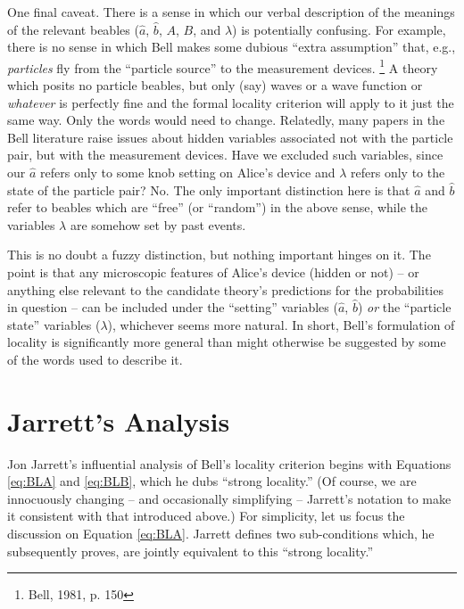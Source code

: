 \documentclass[12pt]{article}
\begin{document}
One final caveat.  There is a sense in which our
verbal description of the meanings of the relevant beables ($\hat{a}$,
$\hat{b}$, $A$, $B$, and $\lambda$) is potentially confusing.  For
example, there is no sense in which Bell makes some dubious ``extra
assumption'' that, e.g., \emph{particles} fly from the ``particle
source'' to the measurement devices.   
\footnote{Bell, 1981, p. 150}
A theory which posits no
particle beables, but only (say) waves or a wave function or \emph{whatever}
is perfectly fine and the formal locality criterion
will apply to it just the same way.  Only the words would need to
change.  Relatedly, many papers in the Bell literature raise issues
about hidden variables associated not with the particle pair, but with
the measurement devices.  Have we excluded such variables, since our
$\hat{a}$ refers only to some knob setting on Alice's device and
$\lambda$ refers only to the state of the particle pair?  No.  The
only important distinction here is that $\hat{a}$ and $\hat{b}$ refer 
to beables which are ``free'' (or ``random'') in the above sense,
while the variables $\lambda$ are somehow set by past events.

This is no doubt a fuzzy distinction, but nothing important hinges on
it.  The point is that any
microscopic features of Alice's device (hidden or not)  -- or anything
else relevant to the candidate theory's predictions for the probabilities in
question -- can be included under the ``setting'' variables ($\hat{a}$,
$\hat{b}$) \emph{or} the ``particle state'' variables ($\lambda$),
whichever seems more natural.  In short, Bell's formulation of
locality is significantly more general than might otherwise be
suggested by some of the words used to describe it.





\section{Jarrett's Analysis}

Jon Jarrett's influential analysis of Bell's locality criterion 
begins with Equations \ref{eq:BLA} and \ref{eq:BLB}, which he dubs
``strong locality.''  (Of course, we are innocuously 
changing -- and occasionally
simplifying -- Jarrett's notation to make it consistent with that
introduced above.)  For simplicity, let us focus the discussion 
on Equation \ref{eq:BLA}.  Jarrett defines two sub-conditions which,
he subsequently proves, are jointly equivalent to this ``strong locality.''
\end{document}
